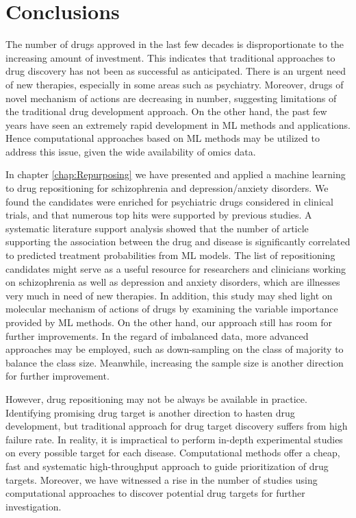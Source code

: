 \chapter{Conclusions}
  The number of drugs approved in the last few decades is disproportionate to the increasing amount of investment. This indicates that traditional approaches to drug discovery has not been as successful as anticipated. There is an urgent need of new therapies, especially in some areas such as psychiatry. Moreover, drugs of novel mechanism of actions are decreasing in number, suggesting limitations of the traditional drug development approach. On the other hand, the past few years have seen an extremely rapid development in ML methods and applications. Hence computational approaches based on ML methods may be utilized to address this issue, given the wide availability of omics data. 

  In chapter \ref{chap:Repurposing} we have presented and applied a machine learning to drug repositioning for schizophrenia and depression/anxiety disorders. We found the candidates were enriched for psychiatric drugs considered in clinical trials, and that numerous top hits were supported by previous studies. A systematic literature support analysis showed that the number of article supporting the association between the drug and disease is significantly correlated to predicted treatment probabilities from ML models. The list of repositioning candidates might serve as a useful resource for researchers and clinicians working on schizophrenia as well as depression and anxiety disorders, which are illnesses very much in need of new therapies. In addition, this study may shed light on molecular mechanism of actions of drugs by examining the variable importance provided by ML methods. On the other hand, our approach still has room for further improvements. In the regard of imbalanced data, more advanced approaches may be employed, such as down-sampling on the class of majority to balance the class size. Meanwhile, increasing the sample size is another direction for further improvement. 

  However, drug repositioning may not be always be available in practice. Identifying promising drug target is another direction to hasten drug development, but traditional approach for drug target discovery suffers from high failure rate. In reality, it is impractical to perform in-depth experimental studies on every possible target for each disease. Computational methods offer a cheap, fast and systematic high-throughput approach to guide prioritization of drug targets. Moreover, we have witnessed a rise in the number of studies using computational approaches to discover potential drug targets for further investigation.

